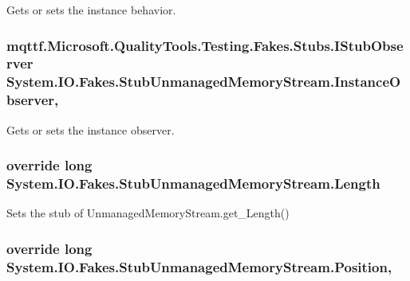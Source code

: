 Gets or sets the instance behavior.

\hypertarget{class_system_1_1_i_o_1_1_fakes_1_1_stub_unmanaged_memory_stream_ab6362b31b120e07056c6a98a2c8ca717}{
\subsubsection[{Instance\-Observer}]{\setlength{\rightskip}{0pt plus 5cm}mqttf.\-Microsoft.\-Quality\-Tools.\-Testing.\-Fakes.\-Stubs.\-I\-Stub\-Observer System.\-I\-O.\-Fakes.\-Stub\-Unmanaged\-Memory\-Stream.\-Instance\-Observer\hspace{0.3cm}{\ttfamily [get]}, {\ttfamily [set]}}}\label{class_system_1_1_i_o_1_1_fakes_1_1_stub_unmanaged_memory_stream_ab6362b31b120e07056c6a98a2c8ca717}


Gets or sets the instance observer.

\hypertarget{class_system_1_1_i_o_1_1_fakes_1_1_stub_unmanaged_memory_stream_a736d401a9e9515c8fe8781e5b87e43bb}{
\subsubsection[{Length}]{\setlength{\rightskip}{0pt plus 5cm}override long System.\-I\-O.\-Fakes.\-Stub\-Unmanaged\-Memory\-Stream.\-Length\hspace{0.3cm}{\ttfamily [get]}}}\label{class_system_1_1_i_o_1_1_fakes_1_1_stub_unmanaged_memory_stream_a736d401a9e9515c8fe8781e5b87e43bb}


Sets the stub of Unmanaged\-Memory\-Stream.\-get\-\_\-\-Length()

\hypertarget{class_system_1_1_i_o_1_1_fakes_1_1_stub_unmanaged_memory_stream_ab7f63a0c3b885888bd89a2a8d8b86788}{
\subsubsection[{Position}]{\setlength{\rightskip}{0pt plus 5cm}override long System.\-I\-O.\-Fakes.\-Stub\-Unmanaged\-Memory\-Stream.\-Position\hspace{0.3cm}{\ttfamily [get]}, {\ttfamily [set]}}}\label{class_system_1_1_i_o_1_1_fakes_1_1_stub_unmanaged_memory_stream_ab7f63a0c3b885888bd89a2a8d8b86788}


